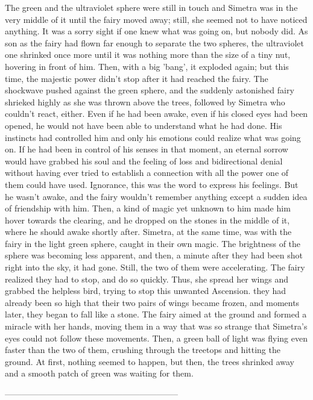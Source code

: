 The green and the ultraviolet sphere were still in touch and Simetra was in the very middle of it until the fairy moved away; still, she seemed not to have noticed anything. It was a sorry sight if one knew what was going on, but nobody did. 
As son as the fairy had flown far enough to separate the two spheres, the ultraviolet one shrinked once more until it was nothing more than the size of a tiny nut, hovering in front of him. 
Then, with a big 'bang', it exploded again; but this time, the majestic power didn't stop after it had reached the fairy. The shockwave pushed against the green sphere, and the suddenly astonished fairy shrieked highly as she was thrown above the trees, followed by Simetra who couldn't react, either. 
Even if he had been awake, even if his closed eyes had been opened, he would not have been able to understand what he had done. His instincts had controlled him and only his emotions could realize what was going on. If he had been in control of his senses in that moment, an eternal sorrow would have grabbed his soul and the feeling of loss and bidirectional denial without having ever tried to establish a connection with all the power one of them could have used. Ignorance, this was the word to express his feelings. 
But he wasn't awake, and the fairy wouldn't remember anything except a sudden idea of friendship with him. 
Then, a kind of magic yet unknown to him made him hover towards the clearing, and he dropped on the stones in the middle of it, where he should awake shortly after. 
Simetra, at the same time, was with the fairy in the light green sphere, caught in their own magic. The brightness of the sphere was becoming less apparent, and then, a minute after they had been shot right into the sky, it had gone. 
Still, the two of them were accelerating. The fairy realized they had to stop, and do so quickly. Thus, she spread her wings and grabbed the helpless bird, trying to stop this unwanted Ascension. they had already been so high that their two pairs of wings became frozen, and moments later, they began to fall like a stone. The fairy aimed at the ground and formed a miracle with her hands, moving them in a way that was so strange that Simetra's eyes could not follow these movements. Then, a green ball of light was flying even faster than the two of them, crushing through the treetops and hitting the ground. At first, nothing seemed to happen, but then, the trees shrinked away and a smooth patch of green was waiting for them. 

--------------------------------------------------------------

